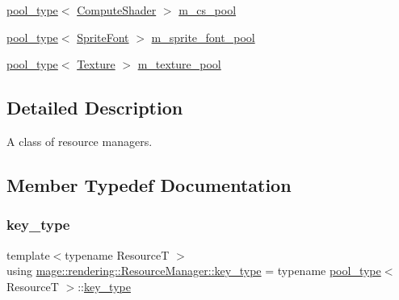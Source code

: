 \begin{DoxyCompactItemize}
\item 
\mbox{\hyperlink{classmage_1_1rendering_1_1_resource_manager_ab21a4e280087032ee533f267bd9bf602}{pool\+\_\+type}}$<$ \mbox{\hyperlink{namespacemage_1_1rendering_aa67e55ba4dca44d39b0367b31f091863}{Compute\+Shader}} $>$ \mbox{\hyperlink{classmage_1_1rendering_1_1_resource_manager_ae0433b0866f523c3c0e6e22197aea86f}{m\+\_\+cs\+\_\+pool}}
\item 
\mbox{\hyperlink{classmage_1_1rendering_1_1_resource_manager_ab21a4e280087032ee533f267bd9bf602}{pool\+\_\+type}}$<$ \mbox{\hyperlink{classmage_1_1rendering_1_1_sprite_font}{Sprite\+Font}} $>$ \mbox{\hyperlink{classmage_1_1rendering_1_1_resource_manager_a0319ef8aad59a69098e6c0a89b6c912e}{m\+\_\+sprite\+\_\+font\+\_\+pool}}
\item 
\mbox{\hyperlink{classmage_1_1rendering_1_1_resource_manager_ab21a4e280087032ee533f267bd9bf602}{pool\+\_\+type}}$<$ \mbox{\hyperlink{classmage_1_1rendering_1_1_texture}{Texture}} $>$ \mbox{\hyperlink{classmage_1_1rendering_1_1_resource_manager_aaf5faede84cdce3bd2589936d5ba3b18}{m\+\_\+texture\+\_\+pool}}
\end{DoxyCompactItemize}


\subsection{Detailed Description}
A class of resource managers. 

\subsection{Member Typedef Documentation}
\mbox{\label{classmage_1_1rendering_1_1_resource_manager_a097b505b275b411e02c73d1899e91a44}} 
\subsubsection{\texorpdfstring{key\+\_\+type}{key\_type}}
{\footnotesize\ttfamily template$<$typename ResourceT $>$ \\
using \mbox{\hyperlink{classmage_1_1rendering_1_1_resource_manager_a097b505b275b411e02c73d1899e91a44}{mage\+::rendering\+::\+Resource\+Manager\+::key\+\_\+type}} =  typename \mbox{\hyperlink{classmage_1_1rendering_1_1_resource_manager_ab21a4e280087032ee533f267bd9bf602}{pool\+\_\+type}}$<$ ResourceT $>$\+::\mbox{\hyperlink{classmage_1_1rendering_1_1_resource_manager_a097b505b275b411e02c73d1899e91a44}{key\+\_\+type}}}

